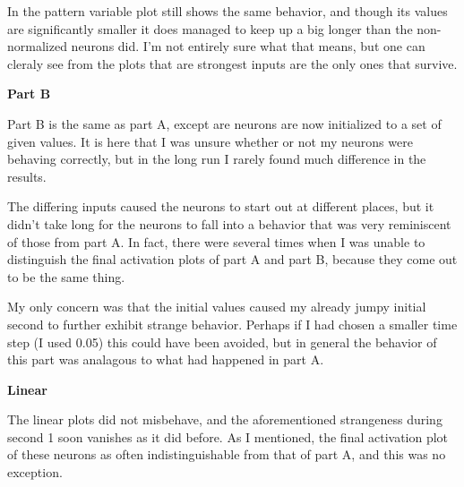 \documentclass[a4paper,12pt]{article}
\begin{document}
In the pattern variable plot still shows the same behavior, and though its values are significantly smaller it does managed to keep up a big longer than the non-normalized neurons did. I'm not entirely sure what that means, but one can cleraly see from the plots that are strongest inputs are the only ones that survive. 

\begin{figure}[h!]
\end{figure}

\begin{figure}[h!]
\begin{center}
\end{center}
\end{figure}

\vfil\eject

{\bf Part B}
\bigskip

Part B is the same as part A, except are neurons are now initialized to a set of given values. It is here that I was unsure whether or not my neurons were behaving correctly, but in the long run I rarely found much difference in the results.

\vspace{2mm}



The differing inputs caused the neurons to start out at different places, but it didn't take long for the neurons to fall into a behavior that was very reminiscent of those from part A. In fact, there were several times when I was unable to distinguish the final activation plots of part A and part B, because they come out to be the same thing. 

\vspace{2mm}

My only concern was that the initial values caused my already jumpy initial second to further exhibit strange behavior. Perhaps if I had chosen a smaller time step (I used 0.05) this could have been avoided, but in general the behavior of this part was analagous to what had happened in part A. 

\bigskip
{\bf Linear}
\bigskip

The linear plots did not misbehave, and the aforementioned strangeness during second 1 soon vanishes as it did before. As I mentioned, the final activation plot of these neurons as often indistinguishable from that of part A, and this was no exception. 
\end{document}
